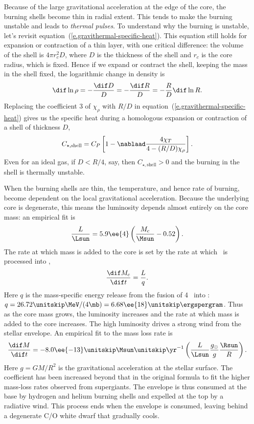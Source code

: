 Because of the large gravitational acceleration at the edge of the core, the burning shells become thin in radial extent.  This tends to make the burning unstable and leads to \emph{thermal pulses}.
To understand why the burning is unstable, let's revisit equation~(\ref{e.gravithermal-specific-heat}).  This equation still holds for expansion or contraction of a thin layer, with one critical difference: the volume of the shell is $4\pi r_{c}^{2}D$, where $D$ is the thickness of the shell and $r_{c}$ is the core radius, which is fixed. Hence if we expand or contract the shell, keeping the mass in the shell fixed, the logarithmic change in density is
\[ \dif\ln\rho = -\frac{\dif D}{D} = -\frac{\dif R}{D} = -\frac{R}{D}\dif\ln R. \]
Replacing the coefficient 3 of $\chi_{\rho}$ with $R/D$ in equation~(\ref{e.gravithermal-specific-heat}) gives us the specific heat during a homologous expansion or contraction of a shell of thickness $D$,
\begin{equation}\label{e.thin-shell-specific-heat}
 C_{\star,\mathrm{shell}} = C_{P}\left[1-\nablaad\frac{4\chi_{T}}{4-(R/D)\chi_{\rho}}\right].
\end{equation}
Even for an ideal gas, if $D < R/4$, say, then $C_{\star,\mathrm{shell}} > 0$ and the burning in the shell is thermally unstable.

When the burning shells are thin, the temperature, and hence rate of burning, become dependent on the local gravitational acceleration.  Because the underlying core is degenerate, this means the luminosity depends almost entirely on the core mass: an empirical fit is\cite{Paczynski1970Evolution-of-Si}
\begin{equation}\label{e.paczynski}
\frac{L}{\Lsun} = 5.9\ee{4}\left(\frac{M_{c}}{\Msun}-0.52\right).
\end{equation}
The rate at which mass is added to the core is set by the rate at which \hydrogen\ is processed into \helium,
\begin{equation}\label{e.mdot-core}
\frac{\dif M_{c}}{\dif t} = \frac{L}{q}.
\end{equation}
Here $q$ is the mass-specific energy release from the fusion of 4 \hydrogen\ into \helium: $q = 26.72\nsp\MeV/(4\mb) = 6.68\ee{18}\nsp\ergspergram$.  Thus as the core mass grows, the luminosity increases and the rate at which mass is added to the core increases.  The high luminosity drives a strong wind from the stellar envelope.  An empirical fit to the mass loss rate is\cite{Reimers1977On-the-absolute}
\begin{equation}\label{e.wind-loss}
\frac{\dif M}{\dif t} = - 8.0\ee{-13}\nsp\Msun\usp\yr^{-1} \left(\frac{L}{\Lsun}\frac{g_{\sun}}{g}\frac{\Rsun}{R}\right).
\end{equation}
Here $g = GM/R^{2}$ is the gravitational acceleration at the stellar surface.  The coefficient has been increased beyond that in the original formula  to fit the higher mass-loss rates observed from supergiants\cite{Schroder2001The-galactic-ma}.  The envelope is thus consumed at the base by hydrogen and helium burning shells and expelled at the top by a radiative wind. This process ends when the envelope is consumed, leaving behind a degenerate C/O white dwarf that gradually cools.


